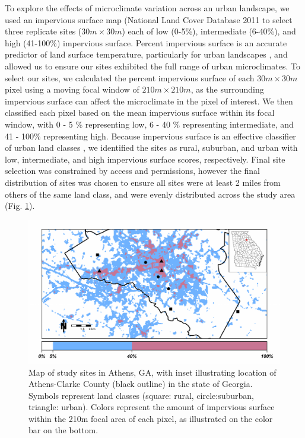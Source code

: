 \documentclass[12pt]{article}
\begin{document}
To explore the effects of microclimate variation across an urban landscape, we used an impervious surface map (National Land Cover Database 2011 \citep{xian2011} to select three replicate sites ($30m \times 30m$) each of low (0-5\%), intermediate (6-40\%), and high (41-100\%) impervious surface. Percent impervious surface is an accurate predictor of land surface temperature, particularly for urban landscapes \citep{yuan2007}, and allowed us to ensure our sites exhibited the full range of urban microclimates. To select our sites, we calculated the percent impervious surface of each $30m \times 30m$ pixel using a moving focal window of $210m \times 210m$, as the surrounding impervious surface can affect the microclimate in the pixel of interest. We then classified each pixel based on the mean impervious surface within its focal window, with 0 - 5 \% representing low, 6 - 40 \% representing intermediate, and 41 - 100\% representing high. Because impervious surface is an effective classifier of urban land classes \citep{lu2006}, we identified the sites as rural, suburban, and urban with low, intermediate, and high impervious surface scores, respectively. Final site selection was constrained by access and permissions, however the final distribution of sites was chosen to ensure all sites were at least 2 miles from others of the same land class, and were evenly distributed across the study area (Fig. \ref{Fig:siteMap}). 

\begin{figure}
\centering\includegraphics[width=0.9\linewidth]{siteMapinset.pdf}
\caption{Map of study sites in Athens, GA, with inset illustrating location of Athens-Clarke County (black outline) in the state of Georgia. Symbols represent land classes (square: rural, circle:suburban, triangle: urban). Colors represent the amount of impervious surface within the 210m focal area of each pixel, as illustrated on the color bar on the bottom.}
\label{Fig:siteMap}
\end{figure}
\end{document}
